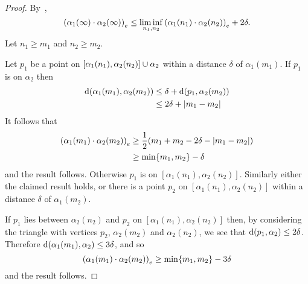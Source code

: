 \documentclass[a4paper]{article}
\begin{document}
\begin{proof}
  By~\cite[III.H.3.17]{bridsonhaefliger99},
  \begin{equation*}
    \gromov{e}{\alpha_1(\infty)}{\alpha_2(\infty)} \leq \liminf_{n_1, n_2}
        \gromov{e}{\alpha_1(n_1)}{\alpha_2(n_2)} + 2\delta.
  \end{equation*}
  Let $n_1 \geq m_1$ and $n_2 \geq m_2$. 
  
  Let $p_1$ be a point on $[\alpha_1(n_1), \alpha_2(n_2)] \union \alpha_2$
  within a distance $\delta$ of $\alpha_1(m_1)$.  If $p_1$ is on $\alpha_2$
  then
  \begin{align*}
    \dist(\alpha_1(m_1), \alpha_2(m_2)) 
      & \leq \delta + \dist(p_1, \alpha_2(m_2)) \\
      & \leq 2\delta + \abs{m_1 - m_2}
  \end{align*}
  It follows that
  \begin{align*}
    \gromov{e}{\alpha_1(m_1)}{\alpha_2(m_2)} 
      &\geq \frac{1}{2}(m_1 + m_2 - 2\delta - \abs{m_1 - m_2})\\
      &\geq \min\{m_1, m_2\} - \delta
  \end{align*} 
  and the result follows. Otherwise $p_1$ is on $[\alpha_1(n_1),
  \alpha_2(n_2)]$. Similarly either the claimed result holds, or there is a
  point $p_2$ on $[\alpha_1(n_1), \alpha_2(n_2)]$ within a
  distance $\delta$ of $\alpha_1(m_2)$.
  
  If $p_1$ lies between $\alpha_2(n_2)$ and $p_2$ on $[\alpha_1(n_1),
  \alpha_2(n_2)]$ then, by considering the triangle with vertices $p_2$,
  $\alpha_2(m_2)$ and $\alpha_2(n_2)$, we see that $\dist(p_1, \alpha_2) \leq
  2\delta$. Therefore $\dist(\alpha_1(m_1), \alpha_2) \leq 3\delta$, and so
  \begin{equation*}
    \gromov{e}{\alpha_1(m_1)}{\alpha_2(m_2)} \geq \min\{m_1, m_2\} - 3\delta
  \end{equation*}
  and the result follows.


\end{proof}
\end{document}

